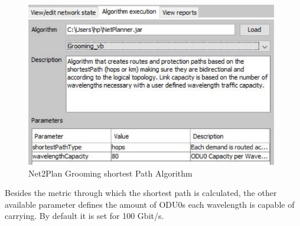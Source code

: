 	\vspace{0.5cm}
	\begin{figure}[h!]
		\centering
		\includegraphics[width = 11cm]{Grooming_Algorithm.pdf}
		\caption{Net2Plan Grooming shortest Path Algorithm}
		\label{Grooming_Algorithm}
	\end{figure}	
	
	Besides the metric through which the shortest path is calculated, the other available parameter defines the amount of ODU0s each wavelength is capable of carrying. By default it is set for 100 Gbit/s.\\

	
		
	
